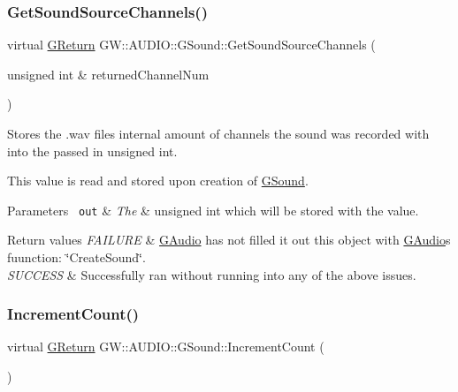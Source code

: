 \subsubsection{\texorpdfstring{GetSoundSourceChannels()}{GetSoundSourceChannels()}}
{\footnotesize\ttfamily virtual \mbox{\hyperlink{namespaceGW_a67a839e3df7ea8a5c5686613a7a3de21}{G\+Return}} G\+W\+::\+A\+U\+D\+I\+O\+::\+G\+Sound\+::\+Get\+Sound\+Source\+Channels (\begin{DoxyParamCaption}\item[{unsigned int \&}]{returned\+Channel\+Num }\end{DoxyParamCaption})\hspace{0.3cm}{\ttfamily [pure virtual]}}



Stores the .wav files internal amount of channels the sound was recorded with into the passed in unsigned int. 

This value is read and stored upon creation of \mbox{\hyperlink{classGW_1_1AUDIO_1_1GSound}{G\+Sound}}.


\begin{DoxyParams}[1]{Parameters}
\mbox{\texttt{ out}}  & {\em The} & unsigned int which will be stored with the value.\\
\hline
\end{DoxyParams}

\begin{DoxyRetVals}{Return values}
{\em F\+A\+I\+L\+U\+RE} & \mbox{\hyperlink{classGW_1_1AUDIO_1_1GAudio}{G\+Audio}} has not filled it out this object with \mbox{\hyperlink{classGW_1_1AUDIO_1_1GAudio}{G\+Audio}}\textquotesingle{}s fuunction\+: \char`\"{}\+Create\+Sound\char`\"{}. \\
\hline
{\em S\+U\+C\+C\+E\+SS} & Successfully ran without running into any of the above issues. \\
\hline
\end{DoxyRetVals}
\mbox{\label{classGW_1_1AUDIO_1_1GSound_a33149257f0958b4db57f5508492410ad}} 
\subsubsection{\texorpdfstring{IncrementCount()}{IncrementCount()}}
{\footnotesize\ttfamily virtual \mbox{\hyperlink{namespaceGW_a67a839e3df7ea8a5c5686613a7a3de21}{G\+Return}} G\+W\+::\+A\+U\+D\+I\+O\+::\+G\+Sound\+::\+Increment\+Count (\begin{DoxyParamCaption}{ }\end{DoxyParamCaption})\hspace{0.3cm}{\ttfamily [pure virtual]}}



